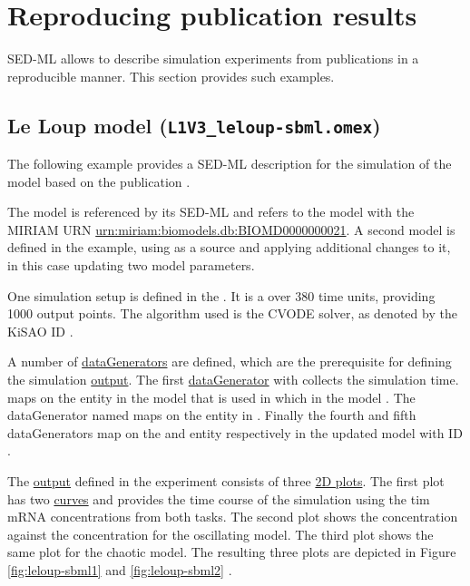 \pagebreak
\section{Reproducing publication results}
SED-ML allows to describe simulation experiments from publications in a reproducible manner. This section provides such examples.

\subsection{Le Loup model (\texttt{L1V3\_leloup-sbml.omex})}
\label{example:leloup_sbml}
The following example provides a SED-ML description for the simulation of the model based on the publication \cite{LeLoup1999}.

The model is referenced by its SED-ML \hyperref[sec:id]{}  and refers to the model with the MIRIAM URN \url{urn:miriam:biomodels.db:BIOMD0000000021}. A second model is defined in the example, using  as a source and applying additional changes to it, in this case updating two model parameters.

One simulation setup is defined in the . It is a  over 380 time units, providing 1000 output points. The algorithm used is the CVODE solver, as denoted by the KiSAO ID .

A number of \hyperref[class:dataGenerator]{dataGenerators} are defined, which are the prerequisite for defining the simulation \hyperref[class:output]{output}. The first \hyperref[class:dataGenerator]{dataGenerator} with \hyperref[sec:id]{}  collects the simulation time.  maps on the  entity in the model that is used in  which in the model . The dataGenerator named  maps on the  entity in . Finally  the fourth and fifth dataGenerators map on the  and  entity respectively in the updated model with ID .

The \hyperref[class:output]{output} defined in the experiment consists of three \hyperref[class:plot2D]{2D plots}. The first plot has two \hyperref[class:curve]{curves} and provides the time course of the simulation using the tim mRNA concentrations from both tasks. The second plot shows the  concentration against the  concentration for the oscillating model. The third plot shows the same plot for the chaotic model. The resulting three plots are depicted in Figure \ref{fig:leloup-sbml1} and \ref{fig:leloup-sbml2} . 

